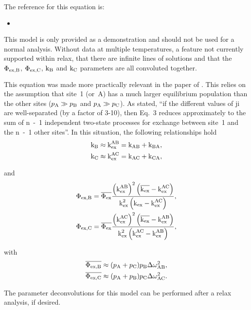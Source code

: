 The reference for this equation is:
\begin{itemize}
\item {}
\end{itemize}

This model is only provided as a demonstration and should not be used for a normal analysis.
Without data at multiple temperatures, a feature not currently supported within relax, that there are infinite lines of solutions and that the $\Phi_\textrm{ex,B}$, $\Phi_\textrm{ex,C}$, $\textrm{k}_\textrm{B}$ and $\textrm{k}_\textrm{C}$ parameters are all convoluted together.

This equation was made more practically relevant in the paper of \citet{OConnell09}.
This relies on the assumption that site~1 (or~A) has a much larger equilibrium population than the other sites ($p_\textrm{A} \gg p_\textrm{B}$ and $p_\textrm{A} \gg p_\textrm{C}$).
As stated, ``if the different values of ji are well-separated (by a factor of 3-10), then Eq.~3 reduces approximately to the sum of n~-~1 independent two-state processes for exchange between site~1 and the n~-~1 other sites''.
In this situation, the following relationships hold
\begin{subequations}
\begin{align}
    &\textrm{k}_\textrm{B} \approx \textrm{k}_\textrm{ex}^\textrm{AB} = \textrm{k}_\textrm{AB} + \textrm{k}_\textrm{BA} , \\
    &\textrm{k}_\textrm{C} \approx \textrm{k}_\textrm{ex}^\textrm{AC} = \textrm{k}_\textrm{AC} + \textrm{k}_\textrm{CA} ,
\end{align}
\end{subequations}

and
\begin{subequations}
\begin{align}
    &\Phi_\textrm{ex,B} = \overline{\Phi_\textrm{ex}} \frac{\left(\textrm{k}_\textrm{ex}^\textrm{AB}\right)^2 \left( \overline{\textrm{k}_\textrm{ex}} - \textrm{k}_\textrm{ex}^\textrm{AC} \right)}{\textrm{k}_\textrm{ex}^2 \left( \textrm{k}_\textrm{ex} - \textrm{k}_\textrm{ex}^\textrm{AC} \right)} , \label{eq: disp phiexB} \\
    &\Phi_\textrm{ex,C} = \overline{\Phi_\textrm{ex}} \frac{\left(\textrm{k}_\textrm{ex}^\textrm{AC}\right)^2 \left( \overline{\textrm{k}_\textrm{ex}} - \textrm{k}_\textrm{ex}^\textrm{AB} \right)}{\textrm{k}_\textrm{ex}^2 \left( \textrm{k}_\textrm{ex}^\textrm{AC} - \textrm{k}_\textrm{ex}^\textrm{AB} \right)} , \label{eq: disp phiexC}
\end{align}
\end{subequations}

with
\begin{subequations}
\begin{align}
    &\overline{\Phi_\textrm{ex,B}} \approx (p_\textrm{A} + p_\textrm{C}) p_\textrm{B} \Delta\omega_\textrm{AB}^2 , \\
    &\overline{\Phi_\textrm{ex,C}} \approx (p_\textrm{A} + p_\textrm{B}) p_\textrm{C} \Delta\omega_\textrm{AC}^2 .
\end{align}
\end{subequations}

The parameter deconvolutions for this model can be performed after a relax analysis, if desired.




